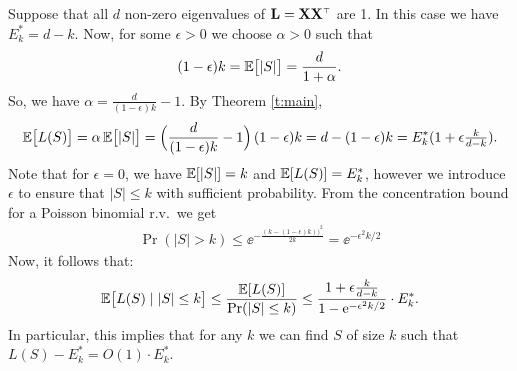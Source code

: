 \documentclass[12pt]{sty/colt2019/colt2018-arxiv}
\begin{document}
Suppose that all $d$ non-zero eigenvalues  of $\L=\X\X^\top$ are 1. In
this case we have $E_k^* = d-k$. Now, for some $\epsilon>0$ we choose
$\alpha>0$ such that
\begin{align*}
(1-\epsilon) k = \mathbb E\big[|S|\big] = \frac{d}{1+\alpha}.
\end{align*}
So, we have $\alpha = \frac d{(1-\epsilon)k}-1$. By Theorem
\ref{t:main},
\begin{align*}
  \mathbb E\big[L(S)\big] = \alpha\, \mathbb E\big[|S|\big] =
\Big(\frac d{(1-\epsilon)k}-1\Big)\,(1-\epsilon) k = d - (1-\epsilon)k
  = E_k^*(1 + \epsilon\tfrac k{d-k}).
\end{align*}
Note that for $\epsilon=0$, we have $\mathbb E[|S|]=k$ and $\mathbb E[L(S)]=E_k^*$,
however we introduce $\epsilon$ to ensure that $|S|\leq k$ with
sufficient probability. From the concentration bound for a Poisson binomial r.v.~we get
\begin{align*}
  \Pr(|S| > k) \leq \ee^{-\frac{(k-(1-\epsilon)k))^2}{2k}} =
  \ee^{-\epsilon^2 k/2}
\end{align*}
Now, it follows that:
\begin{align*}
\mathbb E\big[L(S)\mid |S|\leq k\big] \leq \frac{\mathbb E[L(S)]}{\mathrm{Pr}(|S|\leq k)}
  \leq \frac{1+\epsilon\frac k{d-k}}{1-\mathrm{e}^{-\epsilon^2k/2}}\cdot E_k^*.
\end{align*}
In particular, this implies that for any $k$ we can find $S$ of size
$k$ such that $L(S)-E_k^* = O(1) \cdot E_k^*$. 
\end{document}
